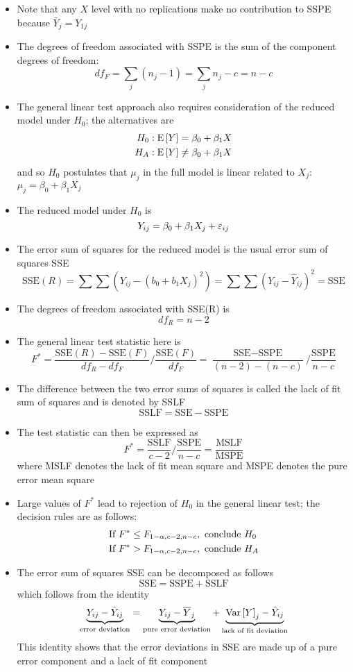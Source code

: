\begin{itemize}
\item Note that any $X$ level with no replications make no contribution to SSPE because $\bar{Y}_j = Y_{1j}$
\item The degrees of freedom associated with SSPE is the sum of the component degrees of freedom: $$ df_F = \sum_j (n_j - 1) = \sum_j n_j - c = n-c $$ 
\item The general linear test approach also requires consideration of the reduced model under $H_0$; the alternatives are 
$$ \begin{aligned} H_0 &: \mathrm{E}\left[ Y \right] = \beta_0 + \beta_1X \\ H_A &: \mathrm{E}\left[ Y \right] \neq \beta_0 + \beta_1X \end{aligned} $$ and so $H_0$ postulates that $\mu_j$ in the full model is linear related to $X_j$: $\mu_j = \beta_0 + \beta_1X_j$ 
\item The reduced model under $H_0$ is $$ Y_{ij} = \beta_0 + \beta_1X_j + \varepsilon_{ij} $$ 
\item The error sum of squares for the reduced model is the usual error sum of squares SSE $$ \text{SSE}(R) = \sum \sum (Y_{ij} - (b_0 + b_1X_j)^2) = \sum \sum (Y_{ij} - \hat{Y}_{ij})^2 = \text{SSE} $$ 
\item The degrees of freedom associated with SSE(R) is $$ df_R = n-2 $$ 
\item The general linear test statistic here is $$ F^* = \frac{\text{SSE}(R) - \text{SSE}(F)}{df_R - df_F} / \frac{\text{SSE}(F)}{df_F} = \frac{\text{SSE} - \text{SSPE}}{(n-2) - (n-c)} / \frac{\text{SSPE}}{n-c} $$ 
\item The difference between the two error sums of squares is called the lack of fit sum of squares and is denoted by SSLF $$ \text{SSLF} = \text{SSE} - \text{SSPE} $$
\item The test statistic can then be expressed as $$ F^* = \frac{\text{SSLF}}{c-2} / \frac{\text{SSPE}}{n-c} = \frac{\text{MSLF}}{\text{MSPE}} $$ where MSLF denotes the lack of fit mean square and MSPE denotes the pure error mean square
\item Large values of $F^*$ lead to rejection of $H_0$ in the general linear test; the decision rules are as follows: $$ \begin{aligned} \text{If } F^* &\leq F_{1-\alpha, c-2, n-c}, \text{ conclude } H_0 \\ \text{If } F^* &> F_{1-\alpha, c-2, n-c}, \text{ conclude } H_A \end{aligned} $$ 
\item The error sum of squares SSE can be decomposed as follows $$ \text{SSE} = \text{SSPE} + \text{SSLF} $$ which follows from the identity $$ \underbrace{Y_{ij} - \hat{Y}_{ij}}_{\text{error deviation}} = \underbrace{Y_{ij} - \overline{Y}_j}_{\text{pure error deviation}} + \underbrace{\mathrm{Var}\left[ Y \right]_j - \hat{Y}_{ij}}_{\text{lack of fit deviation}} $$ This identity shows that the error deviations in SSE are made up of a pure error component and a lack of fit component 

\end{itemize}
